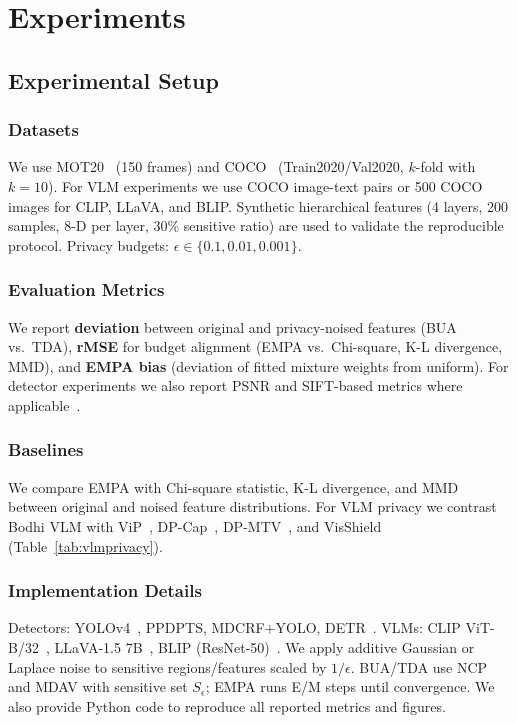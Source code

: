 \documentclass[journal,transmag]{IEEEtran}
\begin{document}
\section{Experiments}
\label{sec:exp}

\subsection{Experimental Setup}
\label{sec:expdesign}

\subsubsection{Datasets}
We use MOT20~\cite{dendorfer2020mot20} (150 frames) and COCO~\cite{lin2014microsoft} (Train2020/Val2020, $k$-fold with $k=10$). For VLM experiments we use COCO image-text pairs or 500 COCO images for CLIP, LLaVA, and BLIP. Synthetic hierarchical features (4 layers, 200 samples, 8-D per layer, 30\% sensitive ratio) are used to validate the reproducible protocol. Privacy budgets: $\epsilon \in \{0.1, 0.01, 0.001\}$.

\subsubsection{Evaluation Metrics}
We report \textbf{deviation} between original and privacy-noised features (BUA vs.\ TDA), \textbf{rMSE} for budget alignment (EMPA vs.\ Chi-square, K-L divergence, MMD), and \textbf{EMPA bias} (deviation of fitted mixture weights from uniform). For detector experiments we also report PSNR and SIFT-based metrics where applicable~\cite{cruz2012scale,sara2019image}.

\subsubsection{Baselines}
We compare EMPA with Chi-square statistic, K-L divergence, and MMD between original and noised feature distributions. For VLM privacy we contrast Bodhi VLM with ViP~\cite{yu2024vip}, DP-Cap~\cite{sander2024dpcap}, DP-MTV~\cite{ngong2026dpmtv}, and VisShield~\cite{chen2025visshield} (Table~\ref{tab:vlmprivacy}).

\subsubsection{Implementation Details}
Detectors: YOLOv4~\cite{bochkovskiy2020yolov4}, PPDPTS, MDCRF+YOLO, DETR~\cite{carion2020end}. VLMs: CLIP ViT-B/32~\cite{radford2021learning}, LLaVA-1.5 7B~\cite{liu2023llava}, BLIP (ResNet-50)~\cite{li2022blip}. We apply additive Gaussian or Laplace noise to sensitive regions/features scaled by $1/\epsilon$. BUA/TDA use NCP and MDAV with sensitive set $S_\epsilon$; EMPA runs E/M steps until convergence. We also provide Python code to reproduce all reported metrics and figures.
\end{document}
